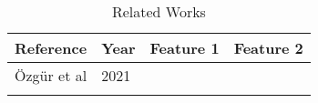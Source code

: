 \begin{table}[]
\caption{Related Works}
\label{table-related-works}
\begin{tabular}{@{}llll@{}}
\toprule
Reference & Year & Feature 1 & Feature 2 \\
\midrule
 Özgür et al \cite{ozgur2021review}  & 2021      &           &           \\
          &      &           &           \\

\bottomrule

\end{tabular}
\end{table}